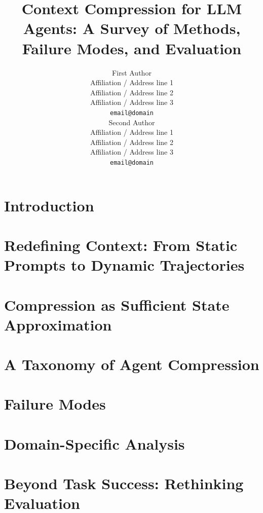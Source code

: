 \documentclass[11pt]{article}
\title{Context Compression for LLM Agents: A Survey of Methods, Failure Modes, and Evaluation}
\author{First Author \\
  Affiliation / Address line 1 \\
  Affiliation / Address line 2 \\
  Affiliation / Address line 3 \\
  \texttt{email@domain} \\\And
  Second Author \\
  Affiliation / Address line 1 \\
  Affiliation / Address line 2 \\
  Affiliation / Address line 3 \\
  \texttt{email@domain} \\}
\begin{document}
\maketitle

\begin{abstract}

\end{abstract}


\section{Introduction}
\label{sec:1_introduction}



\section{Redefining Context: From Static Prompts to Dynamic Trajectories}
\label{sec:2_background}



\section{Compression as Sufficient State Approximation}
\label{sec:3_formal_view}



\section{A Taxonomy of Agent Compression}
\label{sec:3_taxonomy}



\section{Failure Modes}
\label{sec:4_failure_modes}



\section{Domain-Specific Analysis}
\label{sec:5_domain_specific_analysis}



% 
\section{Beyond Task Success: Rethinking Evaluation}
\label{sec:6_evaluation}



% 
\end{document}
